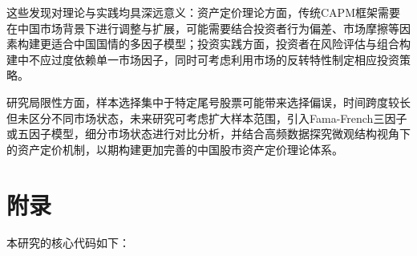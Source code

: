\documentclass[12pt, a4paper]{article}
\begin{document}
这些发现对理论与实践均具深远意义：资产定价理论方面，传统CAPM框架需要在中国市场背景下进行调整与扩展，可能需要结合投资者行为偏差、市场摩擦等因素构建更适合中国国情的多因子模型；投资实践方面，投资者在风险评估与组合构建中不应过度依赖单一市场因子，同时可考虑利用市场的反转特性制定相应投资策略。

研究局限性方面，样本选择集中于特定尾号股票可能带来选择偏误，时间跨度较长但未区分不同市场状态，未来研究可考虑扩大样本范围，引入Fama-French三因子或五因子模型，细分市场状态进行对比分析，并结合高频数据探究微观结构视角下的资产定价机制，以期构建更加完善的中国股市资产定价理论体系。

\printbibliography[title=参考文献]

\section{附录}

本研究的核心代码如下：
\end{document}
